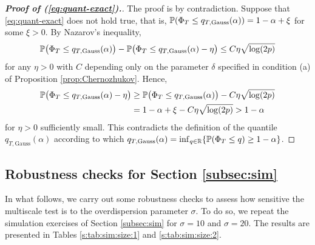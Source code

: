 \documentclass[a4paper,12pt]{article}
\numberwithin{equation}{section}
\begin{document}
\begin{proof}[\textnormal{\textbf{Proof of (\ref{eq:quant-exact}).}}]
The proof is by contradiction. Suppose that \eqref{eq:quant-exact} does not hold true, that is, $\mathbb{P}(\Phi_T \le q_{T,\text{Gauss}}(\alpha)) = 1-\alpha + \xi$ for some $\xi > 0$. By Nazarov's inequality, 
\begin{equation*}
\mathbb{P} \big(\Phi_T \le q_{T,\text{Gauss}}(\alpha)\big) - \mathbb{P}\big(\Phi_T \le q_{T,\text{Gauss}}(\alpha) - \eta\big) \le C \eta \sqrt{\log (2p)} 
\end{equation*}
for any $\eta > 0$ with $C$ depending only on the parameter $\delta$ specified in condition (a) of Proposition \ref{prop:Chernozhukov}. Hence, 
\begin{align*}
\mathbb{P} \big(\Phi_T \le q_{T,\text{Gauss}}(\alpha) - \eta\big) 
 & \ge \mathbb{P}\big(\Phi_T \le q_{T,\text{Gauss}}(\alpha) \big) - C \eta \sqrt{\log(2p)} \\
 & = 1-\alpha + \xi - C \eta \sqrt{\log(2p)} > 1-\alpha
\end{align*}
for $\eta > 0$ sufficiently small. This contradicts the definition of the quantile $q_{T,\text{Gauss}}(\alpha)$ according to which $q_{T,\text{Gauss}}(\alpha) = \inf_{q \in \mathbb{R}} \{ \mathbb{P}(\Phi_T \le q) \ge 1-\alpha \}$. 
\end{proof}

\newpage
\subsection*{Robustness checks for Section \ref{subsec:sim}}\label{s:subsec:robustness}
In what follows, we carry out some robustness checks to assess how sensitive the multiscale test is to the overdispersion parameter $\sigma$. To do so, we repeat the simulation exercises of Section \ref{subsec:sim} for $\sigma = 10$ and $\sigma = 20$. The results are presented in Tables \ref{s:tab:sim:size:1} and \ref{s:tab:sim:size:2}.
\end{document}
